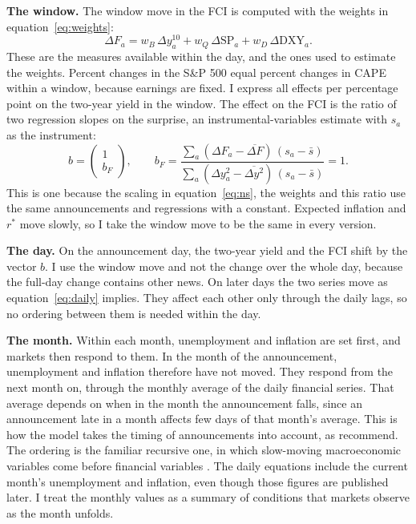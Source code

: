 \documentclass[11pt]{article}
\newcommand{\rs}{r^{*}}
\begin{document}
\textbf{The window.} The window move in the FCI is computed with the weights in equation~\eqref{eq:weights}:
\begin{equation}
\Delta F_a = w_B\, \Delta y^{10}_a + w_Q\, \Delta \text{SP}_a + w_D\, \Delta \text{DXY}_a. \label{eq:winfci}
\end{equation}
These are the measures available within the day, and the ones used to estimate the weights. Percent changes in the S\&P 500 equal percent changes in CAPE within a window, because earnings are fixed. I express all effects per percentage point on the two-year yield in the window. The effect on the FCI is the ratio of two regression slopes on the surprise, an instrumental-variables estimate with $s_a$ as the instrument:
\begin{equation}
b = \begin{pmatrix} 1 \\ b_F \end{pmatrix}, \qquad b_F = \frac{\sum_a (\Delta F_a - \overline{\Delta F})\,(s_a-\bar s)}{\sum_a (\Delta y^{2}_a - \overline{\Delta y^{2}})\,(s_a-\bar s)} = 1. \label{eq:impact}
\end{equation}
This is one because the scaling in equation~\eqref{eq:ns}, the weights and this ratio use the same announcements and regressions with a constant. Expected inflation and $\rs$ move slowly, so I take the window move to be the same in every version.

\textbf{The day.} On the announcement day, the two-year yield and the FCI shift by the vector $b$. I use the window move and not the change over the whole day, because the full-day change contains other news. On later days the two series move as equation~\eqref{eq:daily} implies. They affect each other only through the daily lags, so no ordering between them is needed within the day.

\textbf{The month.} Within each month, unemployment and inflation are set first, and markets then respond to them. In the month of the announcement, unemployment and inflation therefore have not moved. They respond from the next month on, through the monthly average of the daily financial series. That average depends on when in the month the announcement falls, since an announcement late in a month affects few days of that month's average. This is how the model takes the timing of announcements into account, as \citet{jacobson2026} recommend. The ordering is the familiar recursive one, in which slow-moving macroeconomic variables come before financial variables \citep{bernanke1992,christiano1999}. The daily equations include the current month's unemployment and inflation, even though those figures are published later. I treat the monthly values as a summary of conditions that markets observe as the month unfolds.
\end{document}
